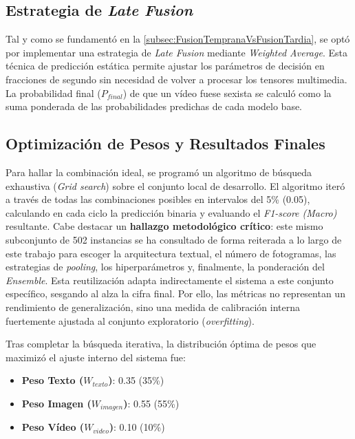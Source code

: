 \subsection{Estrategia de \textit{Late Fusion}}
\label{subsec:EstrategiaDeLateFusion}
Tal y como se fundamentó en la \autoref{subsec:FusionTempranaVsFusionTardia}, se optó por implementar una estrategia de \textit{Late Fusion} mediante \textit{Weighted Average}. Esta técnica de predicción estática permite ajustar los parámetros de decisión en fracciones de segundo sin necesidad de volver a procesar los tensores multimedia. La probabilidad final ($P_{final}$) de que un vídeo fuese sexista se calculó como la suma ponderada de las probabilidades predichas de cada modelo base.

\subsection{Optimización de Pesos y Resultados Finales}
\label{subsec:OptimizacionDePesosYResultadosFinales}
Para hallar la combinación ideal, se programó un algoritmo de búsqueda exhaustiva (\textit{Grid search}) sobre el conjunto local de desarrollo. El algoritmo iteró a través de todas las combinaciones posibles en intervalos del 5\% (0.05), calculando en cada ciclo la predicción binaria y evaluando el \textit{F1-score (Macro)} resultante. Cabe destacar un \textbf{hallazgo metodológico crítico}: este mismo subconjunto de 502 instancias se ha consultado de forma reiterada a lo largo de este trabajo para escoger la arquitectura textual, el número de fotogramas, las estrategias de \textit{pooling}, los hiperparámetros y, finalmente, la ponderación del \textit{Ensemble}. Esta reutilización adapta indirectamente el sistema a este conjunto específico, sesgando al alza la cifra final. Por ello, las métricas no representan un rendimiento de generalización, sino una medida de calibración interna fuertemente ajustada al conjunto exploratorio (\textit{overfitting}).

Tras completar la búsqueda iterativa, la distribución óptima de pesos que maximizó el ajuste interno del sistema fue: 
\begin{itemize}
    \item \textbf{Peso Texto ($W_{texto}$)}: 0.35 (35\%)
    \item \textbf{Peso Imagen ($W_{imagen}$)}: 0.55 (55\%)
    \item \textbf{Peso Vídeo ($W_{video}$)}: 0.10 (10\%)
\end{itemize}


